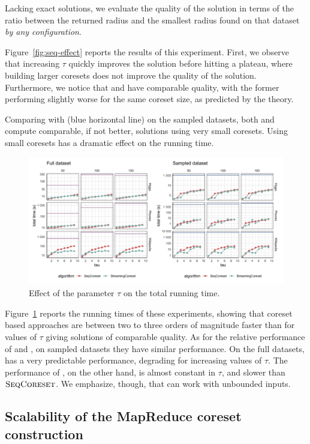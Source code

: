 Lacking exact solutions,
we evaluate the quality of the solution in terms of the ratio between the returned radius
and the smallest radius found on that dataset \emph{by any configuration}.

Figure~\ref{fig:seq-effect} reports the results of this experiment.
First, we observe that increasing $\tau$ quickly improves the solution before hitting a plateau, where
building larger coresets does not improve the quality of the solution.
Furthermore, we notice that \stream and \seq have comparable quality, with the former performing slightly 
worse for the same coreset size, as predicted by the theory.

Comparing with \chen (blue horizontal line) on the sampled datasets, both \seq and \stream compute comparable, 
if not better, solutions using
very small coresets. Using small coresets has a dramatic effect on the running time.

\begin{figure}
    \includegraphics[width=\textwidth]{seq-time}
    \caption{
        \label{fig:seq-time}
        Effect of the parameter $\tau$ on the total running time.
    }
\end{figure}
Figure~\ref{fig:seq-time} reports the running times of these experiments,
showing that coreset based approaches are between two to three orders of magnitude faster than \chen
for values of $\tau$ giving solutions of comparable quality.
As for the relative performance of \seq and \stream, on sampled datasets they have similar performance.
On the full datasets, \seq has a very predictable performance, degrading for increasing values of $\tau$.
The performance of \stream, on the other hand, is almost constant in $\tau$, and slower than $\textsc{SeqCoreset}$.
We emphasize, though, that \stream can work with unbounded inputs.

\subsection{Scalability of the MapReduce coreset construction}
\label{sec:exp:mapreduce}

